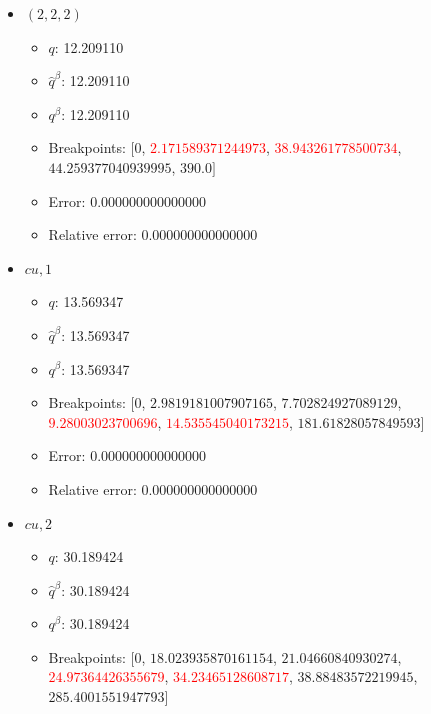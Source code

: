 \documentclass{article}%
\begin{document}
\begin{itemize}
\begin{itemize}
		\item $\hat{q}^\beta$: 87.161080%
		\item $q^\beta$: 87.161080%
		\item Breakpoints: $[$$0$, $9.898970403313276$, $28.333333333333332$, $42.69900440382105$, $48.67452649027746$, \textcolor{red}{$79.83702775273511$}, \textcolor{red}{$720.0$}$]$%
		\item Error: 0.000000000000000%
		\item Relative error: 0.000000000000000%
	\end{itemize}%
	\item $(2, 2, 2)$%
	\begin{itemize}%
		\item $q$: 12.209110%
		\item $\hat{q}^\beta$: 12.209110%
		\item $q^\beta$: 12.209110%
		\item Breakpoints: $[$$0$, \textcolor{red}{$2.171589371244973$}, \textcolor{red}{$38.943261778500734$}, $44.259377040939995$, $390.0$$]$%
		\item Error: 0.000000000000000%
		\item Relative error: 0.000000000000000%
	\end{itemize}%
	\item $\textit{cu},1$%
	\begin{itemize}%
		\item $q$: 13.569347%
		\item $\hat{q}^\beta$: 13.569347%
		\item $q^\beta$: 13.569347%
		\item Breakpoints: $[$$0$, $2.9819181007907165$, $7.702824927089129$, \textcolor{red}{$9.28003023700696$}, \textcolor{red}{$14.535545040173215$}, $181.61828057849593$$]$%
		\item Error: 0.000000000000000%
		\item Relative error: 0.000000000000000%
	\end{itemize}%
	\item $\textit{cu},2$%
	\begin{itemize}%
		\item $q$: 30.189424%
		\item $\hat{q}^\beta$: 30.189424%
		\item $q^\beta$: 30.189424%
		\item Breakpoints: $[$$0$, $18.023935870161154$, $21.04660840930274$, \textcolor{red}{$24.97364426355679$}, \textcolor{red}{$34.23465128608717$}, $38.88483572219945$, $285.4001551947793$$]$%

\end{itemize}
\end{itemize}
\end{document}
